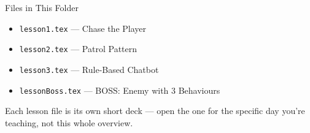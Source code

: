 \documentclass[aspectratio=169]{beamer}
\begin{document}
\begin{frame}{Files in This Folder}
    \small
    \begin{itemize}
        \item \texttt{lesson1.tex} --- Chase the Player
        \item \texttt{lesson2.tex} --- Patrol Pattern
        \item \texttt{lesson3.tex} --- Rule-Based Chatbot
        \item \texttt{lessonBoss.tex} --- BOSS: Enemy with 3 Behaviours
    \end{itemize}
    \vspace{0.5em}
    \normalsize Each lesson file is its own short deck --- open the one for
    the specific day you're teaching, not this whole overview.
\end{frame}
\end{document}
